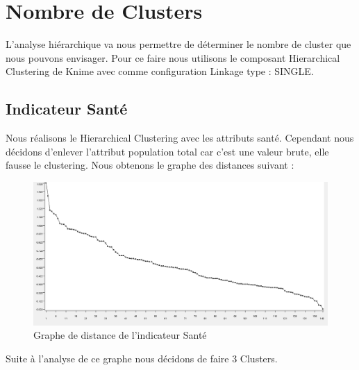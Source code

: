 \section{Nombre de Clusters}
L'analyse hiérarchique va nous permettre de déterminer le nombre de cluster que nous pouvons envisager. Pour ce faire nous utilisons le composant Hierarchical Clustering de Knime avec comme configuration Linkage type : SINGLE.

\subsection{Indicateur Santé}
Nous réalisons le Hierarchical Clustering avec les attributs santé. Cependant nous décidons d'enlever l'attribut population total car c'est une valeur brute, elle fausse le clustering. Nous obtenons le graphe des distances suivant : 

\begin{figure}[H]
	\begin{center}
		\includegraphics[scale=0.5]{Image/DistanceSanteNoMissing2}
		\caption{Graphe de distance de l'indicateur Santé \jeuc}
	\end{center}
\end{figure}

Suite à l'analyse de ce graphe nous décidons de faire 3 Clusters.

